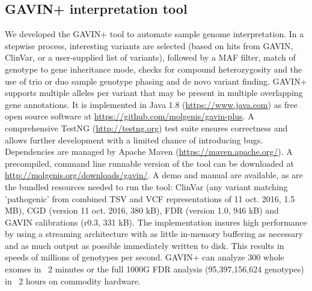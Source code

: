 \subsection{GAVIN+ interpretation tool}
We developed the GAVIN+ tool to automate sample genome interpretation.
In a stepwise process, interesting variants are selected (based on hits from GAVIN\cite{van_der_Velde_2017}, ClinVar\cite{Landrum_2015}, or a user-supplied list of variants), followed by a MAF filter, match of genotype to gene inheritance mode, checks for compound heterozygosity and the use of trio or duo sample genotype phasing and de novo variant finding.
GAVIN+ supports multiple alleles per variant that may be present in multiple overlapping gene annotations.
It is implemented in Java 1.8 (\url{https://www.java.com}) as free open source software at \url{https://github.com/molgenis/gavin-plus}.
A comprehensive TestNG (\url{http://testng.org}) test suite ensures correctness and allows further development with a limited chance of introducing bugs.
Dependencies are managed by Apache Maven (\url{https://maven.apache.org/}).
A precompiled, command line runnable version of the tool can be downloaded at \url{http://molgenis.org/downloads/gavin/}.
A demo and manual are available, as are the bundled resources needed to run the tool: ClinVar (any variant matching 'pathogenic' from combined TSV and VCF representations of 11 oct. 2016, 1.5 MB), CGD (version 11 oct. 2016, 380 kB), FDR (version 1.0, 946 kB) and GAVIN calibrations (r0.3, 331 kB).
The implementation insures high performance by using a streaming architecture with as little in-memory buffering as necessary and as much output as possible immediately written to disk.
This results in speeds of millions of genotypes per second.
 GAVIN+ can analyze 300 whole exomes in ~2 minutes or the full 1000G FDR analysis (95,397,156,624 genotypes) in ~2 hours on commodity hardware.

